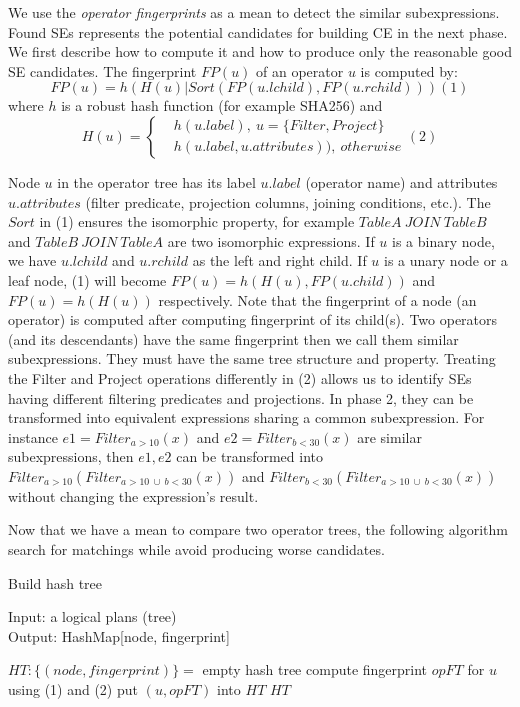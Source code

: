 We use the \emph{operator fingerprints} as a mean to detect the similar subexpressions. Found SEs  represents the potential candidates for building CE in the next phase. We first describe how to compute it and how to produce only the reasonable good SE candidates. The fingerprint $FP(u)$ of an operator $u$ is computed by:
\[FP(u)= h(H(u) | Sort(FP(u.lchild), FP(u.rchild))) (1)\]
where $h$ is a robust hash function (for example SHA256) and 
\[H(u)=
\begin{cases}
 & h(u.label),\ u= \{Filter, Project\}\\ 
 & h(u.label, u.attributes)),\ otherwise
\end{cases} (2)\]

Node $u$ in the operator tree has its label $u.label$ (operator name) and attributes $u.attributes$ (filter predicate, projection columns, joining conditions, etc.). The $Sort$ in (1) ensures the isomorphic property, for example $TableA\ JOIN\ TableB$ and $TableB\ JOIN\ TableA$ are two isomorphic expressions. If $u$ is a binary node, we have $u.lchild$ and $u.rchild$ as the left and right child. If $u$ is a unary node or a leaf node, (1) will become $FP(u)= h(H(u), FP(u.child))$ and $FP(u)= h(H(u))$ respectively. Note that the fingerprint of a node (an operator) is computed after computing fingerprint of its child(s). Two operators (and its descendants) have the same fingerprint then we call them similar subexpressions. They must have the same tree structure and property. Treating the Filter and Project operations differently in (2) allows us to identify SEs having different filtering predicates and projections. In phase 2, they can be transformed into equivalent expressions sharing a common subexpression. For instance $e1 = Filter_{a>10}(x)$ and $e2 = Filter_{b<30}(x)$ are similar subexpressions, then $e1, e2$ can be transformed into $Filter_{a>10}(Filter_{a>10\ \cup \ b < 30}(x))$ and $Filter_{b<30}(Filter_{a>10\ \cup \ b < 30}(x))$ without changing the expression's result.

Now that we have a mean to compare two operator trees, the following algorithm search for matchings while avoid producing worse candidates.

\begin{algorithm}
	\caption{Build hash tree}\label{sec:buildht_alg}
	Input: a logical plans (tree)\\
	Output: HashMap[node, fingerprint]
	\begin{algorithmic}[1]
		\State $HT:\{(node, fingerprint)\}=$ empty hash tree
			\State compute fingerprint $opFT$ for $u$ using (1) and (2)
			\State put $(u, opFT)$ into $HT$
		\EndFor
		\State \Return  $HT$
		\EndProcedure
	\end{algorithmic}
\end{algorithm}

